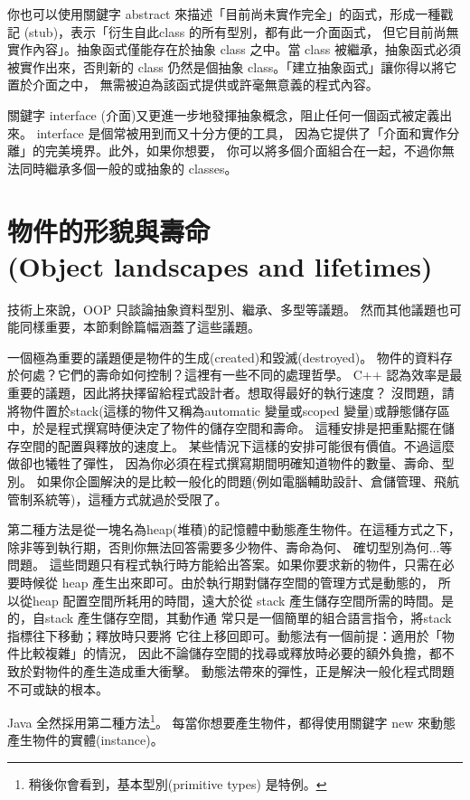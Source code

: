 你也可以使用關鍵字 abstract 來描述「目前尚未實作完全」的函式，形成一種戳記
(stub)，表示「衍生自此class 的所有型別，都有此一介面函式，
但它目前尚無實作內容」。抽象函式僅能存在於抽象 class 之中。當
class 被繼承，抽象函式必須被實作出來，否則新的 class 仍然是個抽象
class。「建立抽象函式」讓你得以將它置於介面之中，
無需被迫為該函式提供或許毫無意義的程式內容。


關鍵字 interface
(介面)又更進一步地發揮抽象概念，阻止任何一個函式被定義出來。
interface 是個常被用到而又十分方便的工具，
因為它提供了「介面和實作分離」的完美境界。此外，如果你想要，
你可以將多個介面組合在一起，不過你無法同時繼承多個一般的或抽象的 classes。
\section{物件的形貌與壽命 \\(Object landscapes and lifetimes)}
技術上來說，OOP 只談論抽象資料型別、繼承、多型等議題。
然而其他議題也可能同樣重要，本節剩餘篇幅涵蓋了這些議題。

一個極為重要的議題便是物件的生成(created)和毀滅(destroyed)。
物件的資料存於何處？它們的壽命如何控制？這裡有一些不同的處理哲學。
C++ 認為效率是最重要的議題，因此將抉擇留給程式設計者。想取得最好的執行速度？
沒問題，請將物件置於stack(這樣的物件又稱為automatic
變量或scoped 變量)或靜態儲存區中，於是程式撰寫時便決定了物件的儲存空間和壽命。
這種安排是把重點擺在儲存空間的配置與釋放的速度上。
某些情況下這樣的安排可能很有價值。不過這麼做卻也犧牲了彈性，
因為你必須在程式撰寫期間明確知道物件的數量、壽命、型別。
如果你企圖解決的是比較一般化的問題(例如電腦輔助設計、倉儲管理、飛航管制系統等)，這種方式就過於受限了。

第二種方法是從一塊名為heap(堆積)的記憶體中動態產生物件。在這種方式之下，
除非等到執行期，否則你無法回答需要多少物件、壽命為何、 確切型別為何...等問題。
這些問題只有程式執行時方能給出答案。如果你要求新的物件，只需在必要時候從
heap 產生出來即可。由於執行期對儲存空間的管理方式是動態的，
所以從heap 配置空間所耗用的時間，遠大於從
stack 產生儲存空間所需的時間。是的，自stack 產生儲存空間，其動作通
常只是一個簡單的組合語言指令，將stack 指標往下移動；釋放時只要將
它往上移回即可。動態法有一個前提：適用於「物件比較複雜」的情況，
因此不論儲存空間的找尋或釋放時必要的額外負擔，都不致於對物件的產生造成重大衝擊。
動態法帶來的彈性，正是解決一般化程式問題不可或缺的根本。

Java 全然採用第二種方法\footnote{稍後你會看到，基本型別(primitive types)
是特例。}。
每當你想要產生物件，都得使用關鍵字 new 來動態產生物件的實體(instance)。

